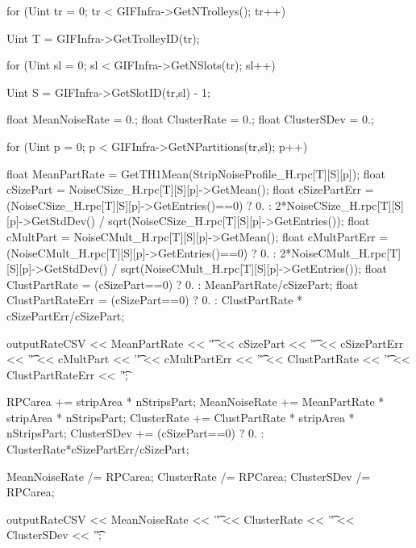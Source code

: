 	\begin{code}
	\begin{cppcode}
for (Uint tr = 0; tr < GIFInfra->GetNTrolleys(); tr++){
	Uint T = GIFInfra->GetTrolleyID(tr);

	for (Uint sl = 0; sl < GIFInfra->GetNSlots(tr); sl++){
		Uint S = GIFInfra->GetSlotID(tr,sl) - 1;

		float MeanNoiseRate = 0.;
		float ClusterRate   = 0.;
		float ClusterSDev   = 0.;

		for (Uint p = 0; p < GIFInfra->GetNPartitions(tr,sl); p++){
			float MeanPartRate = GetTH1Mean(StripNoiseProfile_H.rpc[T][S][p]);
			float cSizePart = NoiseCSize_H.rpc[T][S][p]->GetMean();
			float cSizePartErr = (NoiseCSize_H.rpc[T][S][p]->GetEntries()==0)
				? 0.
				: 2*NoiseCSize_H.rpc[T][S][p]->GetStdDev() /
							sqrt(NoiseCSize_H.rpc[T][S][p]->GetEntries());
			float cMultPart = NoiseCMult_H.rpc[T][S][p]->GetMean();
			float cMultPartErr = (NoiseCMult_H.rpc[T][S][p]->GetEntries()==0)
				? 0.
				: 2*NoiseCMult_H.rpc[T][S][p]->GetStdDev() /
							sqrt(NoiseCMult_H.rpc[T][S][p]->GetEntries());
			float ClustPartRate = (cSizePart==0) ? 0.
				: MeanPartRate/cSizePart;
			float ClustPartRateErr = (cSizePart==0) ? 0.
				: ClustPartRate * cSizePartErr/cSizePart;

			outputRateCSV << MeanPartRate << '\t'
				<< cSizePart << '\t' << cSizePartErr << '\t'
				<< cMultPart << '\t' << cMultPartErr << '\t'
				<< ClustPartRate << '\t' << ClustPartRateErr << '\t';
				
			RPCarea       += stripArea * nStripsPart;
			MeanNoiseRate += MeanPartRate * stripArea * nStripsPart;
			ClusterRate   += ClustPartRate * stripArea * nStripsPart;
			ClusterSDev   += (cSizePart==0)
				? 0.
				: ClusterRate*cSizePartErr/cSizePart;
		}
		
		MeanNoiseRate /= RPCarea;
		ClusterRate   /= RPCarea;
		ClusterSDev   /= RPCarea;

		outputRateCSV << MeanNoiseRate << '\t'
			<< ClusterRate << '\t' << ClusterSDev << '\t';
	}
}
	\end{cppcode}
	\label{cpp:ratecsv}
	\vspace{5mm}
	\end{code}
	
